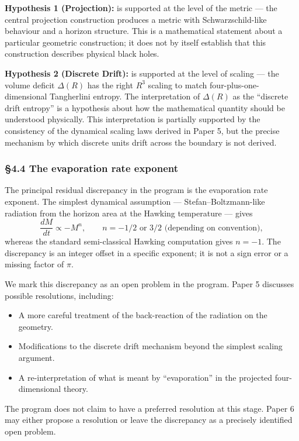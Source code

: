 \documentclass[a4paper,11pt]{article}
\theoremstyle{definition}
\providecommand{\tightlist}{\setlength{\itemsep}{0pt}\setlength{\parskip}{0pt}}
\begin{document}
\textbf{Hypothesis 1 (Projection):} is supported at the level of the
metric --- the central projection construction produces a metric with
Schwarzschild-like behaviour and a horizon structure. This is a
mathematical statement about a particular geometric construction; it
does not by itself establish that this construction describes physical
black holes.

\textbf{Hypothesis 2 (Discrete Drift):} is supported at the level of
scaling --- the volume deficit \(\Delta(R)\) has the right \(R^3\)
scaling to match four-plus-one-dimensional Tangherlini entropy. The
interpretation of \(\Delta(R)\) as the ``discrete drift entropy'' is a
hypothesis about how the mathematical quantity should be understood
physically. This interpretation is partially supported by the
consistency of the dynamical scaling laws derived in Paper 5, but the
precise mechanism by which discrete units drift across the boundary is
not derived.

\subsubsection{§4.4 The evaporation rate
exponent}\label{the-evaporation-rate-exponent}

The principal residual discrepancy in the program is the evaporation
rate exponent. The simplest dynamical assumption ---
Stefan--Boltzmann-like radiation from the horizon area at the Hawking
temperature --- gives
\[\frac{dM}{dt} \propto -M^{n}, \qquad n = -1/2 \text{ or } 3/2 \text{ (depending on convention)},\]
whereas the standard semi-classical Hawking computation gives
\(n = -1\). The discrepancy is an integer offset in a specific exponent;
it is not a sign error or a missing factor of \(\pi\).

We mark this discrepancy as an open problem in the program. Paper 5
discusses possible resolutions, including:

\begin{itemize}
\tightlist
\item
  A more careful treatment of the back-reaction of the radiation on the
  geometry.
\item
  Modifications to the discrete drift mechanism beyond the simplest
  scaling argument.
\item
  A re-interpretation of what is meant by ``evaporation'' in the
  projected four-dimensional theory.
\end{itemize}

The program does not claim to have a preferred resolution at this stage.
Paper 6 may either propose a resolution or leave the discrepancy as a
precisely identified open problem.
\end{document}
